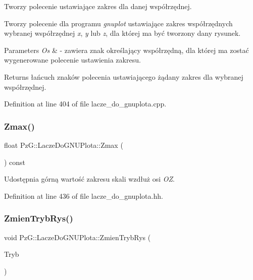 Tworzy polecenie ustawiające zakres dla danej współrzędnej. 

Tworzy polecenie dla programu {\itshape gnuplot} ustawiające zakres współrzędnych wybranej współrzędnej {\itshape x}, {\itshape y} lub {\itshape z}, dla której ma być tworzony dany rysunek. 
\begin{DoxyParams}{Parameters}
{\em Os} & -\/ zawiera znak określający współrzędną, dla której ma zostać wygenerowane polecenie ustawienia zakresu. \\
\hline
\end{DoxyParams}
\begin{DoxyReturn}{Returns}
łańcuch znaków polecenia ustawiającego żądany zakres dla wybranej współrzędnej. 
\end{DoxyReturn}


Definition at line 404 of file lacze\+\_\+do\+\_\+gnuplota.\+cpp.

\mbox{\label{class_pz_g_1_1_lacze_do_g_n_u_plota_a20a5d03e1fc19c682032bffc54340f12}} 
\subsubsection{\texorpdfstring{Zmax()}{Zmax()}}
{\footnotesize\ttfamily float Pz\+G\+::\+Lacze\+Do\+G\+N\+U\+Plota\+::\+Zmax (\begin{DoxyParamCaption}{ }\end{DoxyParamCaption}) const\hspace{0.3cm}{\ttfamily [inline]}}

Udostępnia górną wartość zakresu skali wzdłuż osi {\itshape OZ}. 

Definition at line 436 of file lacze\+\_\+do\+\_\+gnuplota.\+hh.

\mbox{\label{class_pz_g_1_1_lacze_do_g_n_u_plota_a10950349b348fd3a3d4143e95337527c}} 
\subsubsection{\texorpdfstring{Zmien\+Tryb\+Rys()}{ZmienTrybRys()}}
{\footnotesize\ttfamily void Pz\+G\+::\+Lacze\+Do\+G\+N\+U\+Plota\+::\+Zmien\+Tryb\+Rys (\begin{DoxyParamCaption}\item[{\hyperlink{namespace_pz_g_aeedae1ef10c66d720f9e89de408ca4ca}{Tryb\+Rysowania}}]{Tryb }\end{DoxyParamCaption})\hspace{0.3cm}{\ttfamily [inline]}}



